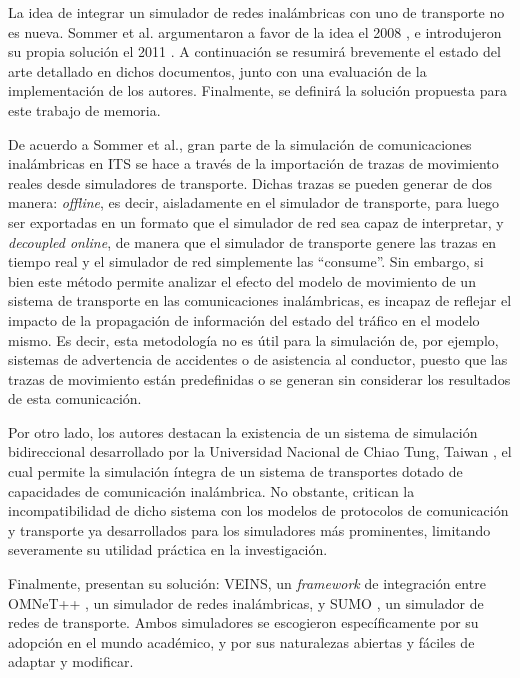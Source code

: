 La idea de integrar un simulador de redes inalámbricas con uno de transporte no es nueva. Sommer et al. argumentaron a favor de la idea el 2008 \autocite{bidirectionalsimul}, e introdujeron su propia solución el 2011 \autocite{sommer_german_dressler}. A continuación se resumirá brevemente el estado del arte detallado en dichos documentos, junto con una evaluación de la implementación de los autores. Finalmente, se definirá la solución propuesta para este trabajo de memoria.

De acuerdo a Sommer et al., gran parte de la simulación de comunicaciones inalámbricas en ITS se hace a través de la importación de trazas de movimiento reales desde simuladores de transporte. Dichas trazas se pueden generar de dos manera: \textit{offline}, es decir, aisladamente en el simulador de transporte, para luego ser exportadas en un formato que el simulador de red sea capaz de interpretar, y \textit{decoupled online}, de manera que el simulador de transporte genere las trazas en tiempo real y el simulador de red simplemente las ``consume''. Sin embargo, si bien este método permite analizar el efecto del modelo de movimiento de un sistema de transporte en las comunicaciones inalámbricas, es incapaz de reflejar el impacto de la propagación de información del estado del tráfico en el modelo mismo. Es decir, esta metodología no es útil para la simulación de, por ejemplo, sistemas de advertencia de accidentes o de asistencia al conductor, puesto que las trazas de movimiento están predefinidas o se generan sin considerar los resultados de esta comunicación.

Por otro lado, los autores destacan la existencia de un sistema de simulación bidireccional desarrollado por la Universidad Nacional de Chiao Tung, Taiwan \autocite{nctuns}, el cual permite la simulación íntegra de un sistema de transportes dotado de capacidades de comunicación inalámbrica. No obstante, critican la incompatibilidad de dicho sistema con los modelos de protocolos de comunicación y transporte ya desarrollados para los simuladores más prominentes, limitando severamente su utilidad práctica en la investigación.


Finalmente, presentan su solución: VEINS, un \textit{framework} de integración entre OMNeT++ \autocite{omnet2008overview}, un simulador de redes inalámbricas, y SUMO \autocite{sumo}, un simulador de redes de transporte. Ambos simuladores se escogieron específicamente por su adopción en el mundo académico, y por sus naturalezas abiertas y fáciles de adaptar y modificar.

